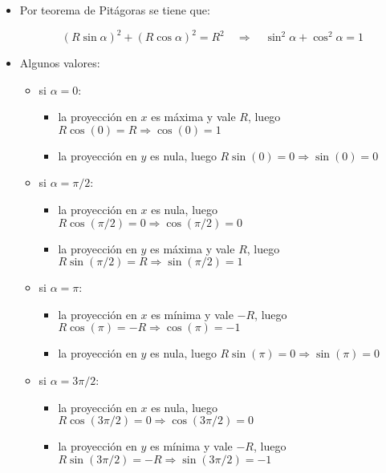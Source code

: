 \documentclass[letterpaper,11pt]{article}
\begin{document}
\begin{itemize}
\item Por teorema de Pitágoras se tiene que:

\begin{equation*}
    (R\sin\alpha)^2+(R\cos\alpha)^2=R^2 \quad \Rightarrow \quad \sin^2\alpha+\cos^2\alpha=1
\end{equation*}

\item Algunos valores:
    \begin{itemize}
        \item si $\alpha=0$:
        \begin{itemize}
            \item la proyección en $x$ es máxima y vale $R$, luego $R\cos(0)=R\Rightarrow\cos(0)=1$
            \item la proyección en $y$ es nula, luego $R\sin(0)=0\Rightarrow \sin(0)=0$
        \end{itemize}
        \item si $\alpha=\pi/2$:
        \begin{itemize}
            \item la proyección en $x$ es nula, luego $R\cos(\pi/2)=0 \Rightarrow \cos(\pi/2)=0$
            \item la proyección en $y$ es máxima y vale $R$, luego $R\sin(\pi/2)=R \Rightarrow \sin(\pi/2)=1$
        \end{itemize}
        
        \item si $\alpha=\pi$: 
        \begin{itemize}
            \item la proyección en $x$ es mínima y vale $-R$, luego $R\cos(\pi)=-R \Rightarrow \cos(\pi)=-1$
            \item la proyección en $y$ es nula, luego $R\sin(\pi)=0 \Rightarrow \sin(\pi)=0$
        \end{itemize}
        
        \item si $\alpha=3\pi/2$:
        \begin{itemize}
            \item la proyección en $x$ es nula, luego $R\cos(3\pi/2)=0 \Rightarrow \cos(3\pi/2)=0$
            \item la proyección en $y$ es mínima y vale $-R$, luego $R\sin(3\pi/2)=-R \Rightarrow \sin(3\pi/2)=-1$
        
        \end{itemize}
        

\end{itemize}
\end{itemize}
\end{document}
